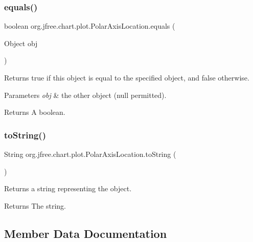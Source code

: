 \subsubsection{\texorpdfstring{equals()}{equals()}}
{\footnotesize\ttfamily boolean org.\+jfree.\+chart.\+plot.\+Polar\+Axis\+Location.\+equals (\begin{DoxyParamCaption}\item[{Object}]{obj }\end{DoxyParamCaption})}

Returns {\ttfamily true} if this object is equal to the specified object, and {\ttfamily false} otherwise.


\begin{DoxyParams}{Parameters}
{\em obj} & the other object ({\ttfamily null} permitted).\\
\hline
\end{DoxyParams}
\begin{DoxyReturn}{Returns}
A boolean. 
\end{DoxyReturn}
\mbox{\label{classorg_1_1jfree_1_1chart_1_1plot_1_1_polar_axis_location_a8ec9f6f533817ad9c8d4fbf3e0f5dd7a}} 
\subsubsection{\texorpdfstring{to\+String()}{toString()}}
{\footnotesize\ttfamily String org.\+jfree.\+chart.\+plot.\+Polar\+Axis\+Location.\+to\+String (\begin{DoxyParamCaption}{ }\end{DoxyParamCaption})}

Returns a string representing the object.

\begin{DoxyReturn}{Returns}
The string. 
\end{DoxyReturn}


\subsection{Member Data Documentation}
\mbox{\label{classorg_1_1jfree_1_1chart_1_1plot_1_1_polar_axis_location_a189d1e3c68d95d0e40521d07eca67cb9}} 
